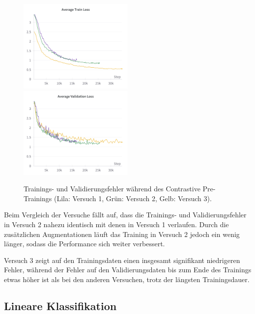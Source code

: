 \begin{figure}[h]
	\centering
	\includegraphics[width=0.5\textwidth]{figure_results_supcon-pre_avg-train-loss.png}%
	\includegraphics[width=0.5\textwidth]{figure_results_supcon-pre_avg-val-loss.png}
	\caption[Trainings- und Validierungsfehler während des Contrastive Pre-Trainings.]{Trainings- und Validierungsfehler während des Contrastive Pre-Trainings (\textcolor{exp1}{Lila}: Versuch 1, \textcolor{exp2}{Grün}: Versuch 2, \textcolor{exp3}{Gelb}: Versuch 3).}
	\label{fig:supcon-pre-loss}
\end{figure}

Beim Vergleich der Versuche fällt auf, dass die Trainings- und Validierungsfehler in Versuch 2 nahezu identisch mit denen in Versuch 1 verlaufen. Durch die zusätzlichen Augmentationen läuft das Training in Versuch 2 jedoch ein wenig länger, sodass die Performance sich weiter verbessert.

Versuch 3 zeigt auf den Trainingsdaten einen insgesamt signifikant niedrigeren Fehler, während der Fehler auf den Validierungsdaten bis zum Ende des Trainings etwas höher ist als bei den anderen Versuchen, trotz der längsten Trainingsdauer.

\subsection{Lineare Klassifikation} \label{subsec:supcon-lin-results}

